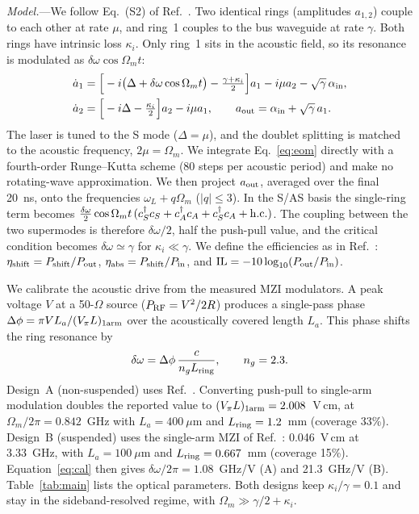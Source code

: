 \documentclass[aps,prl,reprint,superscriptaddress,amsmath,amssymb,floatfix]{revtex4-2}
\newcommand{\etash}{\eta_{\rm shift}}
\newcommand{\etaabs}{\eta_{\rm abs}}
\begin{document}
\emph{Model.}---We follow Eq.~(S2) of Ref.~\cite{Hu2021}. Two identical rings (amplitudes $a_{1,2}$) couple to each other at rate $\mu$, and ring~1 couples to the bus waveguide at rate $\gamma$. Both rings have intrinsic loss $\kappa_i$. Only ring~1 sits in the acoustic field, so its resonance is modulated as $\delta\omega\cos\Omega_m t$:
\begin{align}
\dot a_1&=\Big[-i\big(\Delta+\delta\omega\cos\Omega_m t\big)-\tfrac{\gamma+\kappa_i}{2}\Big]a_1-i\mu a_2-\sqrt{\gamma}\,\alpha_{\rm in},\nonumber\\
\dot a_2&=\Big[-i\Delta-\tfrac{\kappa_i}{2}\Big]a_2-i\mu a_1,\qquad a_{\rm out}=\alpha_{\rm in}+\sqrt{\gamma}\,a_1 .
\label{eq:eom}
\end{align}
The laser is tuned to the S mode ($\Delta=\mu$), and the doublet splitting is matched to the acoustic frequency, $2\mu=\Omega_m$. We integrate Eq.~\eqref{eq:eom} directly with a fourth-order Runge--Kutta scheme (80 steps per acoustic period) and make no rotating-wave approximation. We then project $a_{\rm out}$, averaged over the final 20~ns, onto the frequencies $\omega_L+q\Omega_m$ ($|q|\le3$). In the S/AS basis the single-ring term becomes $\tfrac{\delta\omega}{2}\cos\Omega_m t\,(c_S^\dagger c_S+c_A^\dagger c_A+c_S^\dagger c_A+{\rm h.c.})$. The coupling between the two supermodes is therefore $\delta\omega/2$, half the push-pull value, and the critical condition becomes $\delta\omega\simeq\gamma$ for $\kappa_i\ll\gamma$. We define the efficiencies as in Ref.~\cite{Hu2021}: $\etash=P_{\rm shift}/P_{\rm out}$, $\etaabs=P_{\rm shift}/P_{\rm in}$, and ${\rm IL}=-10\log_{10}(P_{\rm out}/P_{\rm in})$.

We calibrate the acoustic drive from the measured MZI modulators. A peak voltage $V$ at a 50-$\Omega$ source ($P_{\rm RF}=V^2/2R$) produces a single-pass phase $\Delta\phi=\pi V L_a/(V_\pi L)_{\rm 1arm}$ over the acoustically covered length $L_a$. This phase shifts the ring resonance by
\begin{equation}
\delta\omega=\Delta\phi\,\frac{c}{n_g L_{\rm ring}},\qquad n_g=2.3 .
\label{eq:cal}
\end{equation}
Design~A (non-suspended) uses Ref.~\cite{Ni2026}. Converting push-pull to single-arm modulation doubles the reported value to $(V_\pi L)_{\rm 1arm}=2.008$~V\,cm, at $\Omega_m/2\pi=0.842$~GHz with $L_a=400~\mu$m and $L_{\rm ring}=1.2$~mm (coverage 33\%). Design~B (suspended) uses the single-arm MZI of Ref.~\cite{Shao2019}: 0.046~V\,cm at 3.33~GHz, with $L_a=100~\mu$m and $L_{\rm ring}=0.667$~mm (coverage 15\%). Equation~\eqref{eq:cal} then gives $\delta\omega/2\pi=1.08$~GHz/V (A) and 21.3~GHz/V (B). Table~\ref{tab:main} lists the optical parameters. Both designs keep $\kappa_i/\gamma=0.1$ and stay in the sideband-resolved regime, with $\Omega_m\gg\gamma/2+\kappa_i$.
\end{document}
